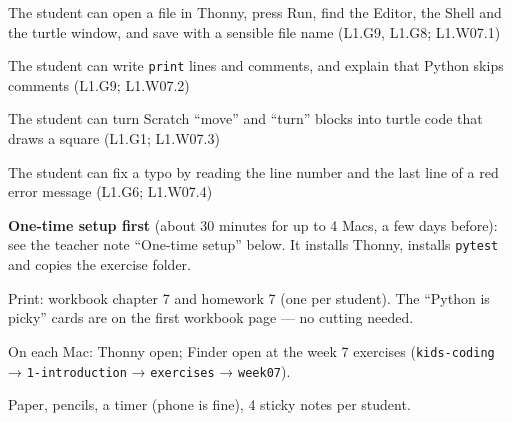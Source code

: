 
\begin{objectives}
  \item The student can open a file in Thonny, press Run, find the Editor, the Shell and the turtle window, and save with a sensible file name (L1.G9, L1.G8; L1.W07.1)
  \item The student can write \texttt{print} lines and comments, and explain that Python skips comments (L1.G9; L1.W07.2)
  \item The student can turn Scratch \enquote{move} and \enquote{turn} blocks into turtle code that draws a square (L1.G1; L1.W07.3)
  \item The student can fix a typo by reading the line number and the last line of a red error message (L1.G6; L1.W07.4)
\end{objectives}

\begin{materials}
  \item \textbf{One-time setup first} (about 30 minutes for up to 4 Macs, a few days before): see the teacher note \enquote{One-time setup} below. It installs Thonny, installs \texttt{pytest} and copies the exercise folder.
  \item Print: workbook chapter 7 and homework 7 (one per student). The \enquote{Python is picky} cards are on the first workbook page --- no cutting needed.
  \item On each Mac: Thonny open; Finder open at the week 7 exercises (\texttt{kids-coding} → \texttt{1-introduction} → \texttt{exercises} → \texttt{week07}).
  \item Paper, pencils, a timer (phone is fine), 4 sticky notes per student.
\end{materials}

